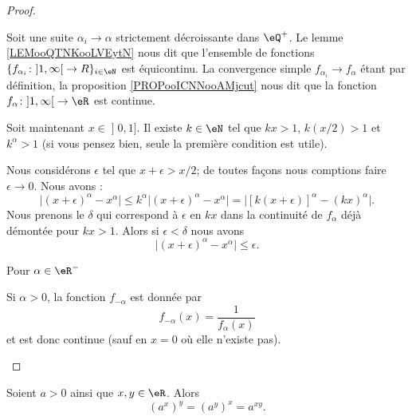 \begin{proof}
\begin{subproof}
            Soit une suite \( \alpha_i\to \alpha\) strictement décroissante dans \( \eQ^+\). Le lemme \ref{LEMooQTNKooLVEytN} nous dit que l'ensemble de fonctions  \( \{ f_{\alpha_i}\colon \mathopen] 1 , \infty \mathclose[\to R \}_{i\in \eN}\) est équicontinu. La convergence simple \( f_{\alpha_i}\to f_{\alpha}\) étant par définition, la proposition \ref{PROPooICNNooAMjcut} nous dit que la fonction \( f_{\alpha}\colon \mathopen] 1 , \infty \mathclose[\to \eR\) est continue.

            Soit maintenant \( x\in \mathopen] 0 , 1 \mathclose]\). Il existe \( k\in \eN\) tel que \( kx>1\), \( k(x/2)>1\) et \( k^{\alpha}>1\) (si vous pensez bien, seule la première condition est utile).

            Nous considérons \( \epsilon\) tel que \( x+\epsilon>x/2\); de toutes façons nous comptions faire \( \epsilon\to 0\). Nous avons :
            \begin{equation}
                \big| (x+\epsilon)^{\alpha}-x^{\alpha} \big|\leq k^{\alpha}\big| (x+\epsilon)^{\alpha}-x^{\alpha} \big|=\big| [k(x+\epsilon)]^{\alpha}-(kx)^{\alpha} \big|.
            \end{equation}
            Nous prenons le \( \delta\) qui correspond à \( \epsilon\) en \( kx\) dans la continuité de \( f_{\alpha}\) déjà démontée pour \( kx>1\). Alors si \( \epsilon<\delta\) nous avons
            \begin{equation}
                \big| (x+\epsilon)^{\alpha}-x^{\alpha} \big|\leq\epsilon.
            \end{equation}
        \item[Pour \( \alpha\in \eR^{-}\)]

            Si \( \alpha>0\), la fonction \( f_{-\alpha}\) est donnée par
            \begin{equation}
                f_{-\alpha}(x)=\frac{1}{  f_{\alpha}(x) }
            \end{equation}
            et est donc continue (sauf en \( x=0\) où elle n'existe pas).
    \end{subproof}
\end{proof}

\begin{proposition}     \label{PROPooDWZKooNwXsdV}
    Soient \( a>0\) ainsi que \( x,y\in \eR\). Alors
    \begin{equation}
        (a^x)^y=(a^y)^x=a^{xy}.
    \end{equation}
\end{proposition}

